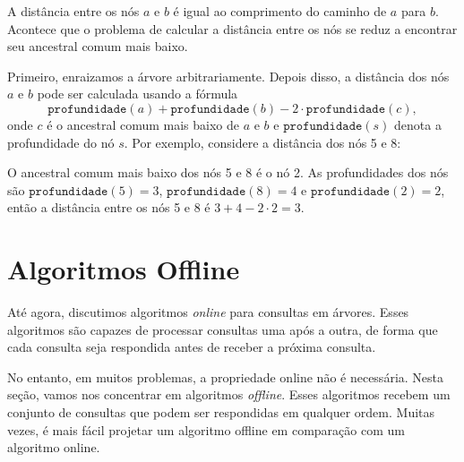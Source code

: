 A distância entre os nós $a$ e $b$ é igual ao comprimento do caminho de $a$ para $b$. Acontece que o problema de calcular a distância entre os nós se reduz a encontrar seu ancestral comum mais baixo.

Primeiro, enraizamos a árvore arbitrariamente. Depois disso, a distância dos nós $a$ e $b$ pode ser calculada usando a fórmula
\[\texttt{profundidade}(a)+\texttt{profundidade}(b)-2 \cdot \texttt{profundidade}(c),\]
onde $c$ é o ancestral comum mais baixo de $a$ e $b$ e $\texttt{profundidade}(s)$ denota a profundidade do nó $s$. Por exemplo, considere a distância dos nós 5 e 8:

\begin{center}
\end{center}

O ancestral comum mais baixo dos nós 5 e 8 é o nó 2. As profundidades dos nós são $\texttt{profundidade}(5)=3$, $\texttt{profundidade}(8)=4$ e $\texttt{profundidade}(2)=2$, então a distância entre os nós 5 e 8 é $3+4-2\cdot2=3$.

\section{Algoritmos Offline}

Até agora, discutimos algoritmos \emph{online} para consultas em árvores. Esses algoritmos são capazes de processar consultas uma após a outra, de forma que cada consulta seja respondida antes de receber a próxima consulta.

No entanto, em muitos problemas, a propriedade online não é necessária. Nesta seção, vamos nos concentrar em algoritmos \emph{offline}. Esses algoritmos recebem um conjunto de consultas que podem ser respondidas em qualquer ordem. Muitas vezes, é mais fácil projetar um algoritmo offline em comparação com um algoritmo online.

